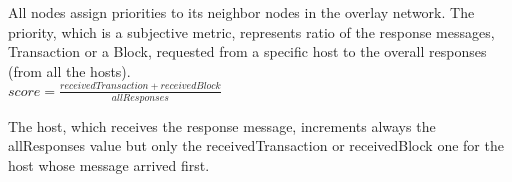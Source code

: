 All nodes assign priorities to its neighbor nodes in the overlay network.
The priority, which is a subjective metric, represents ratio of the response
messages, Transaction or a Block, requested from a specific host to the
overall responses (from all the hosts). \\
$score = \frac{receivedTransaction + receivedBlock}{allResponses}$



The host, which receives the response message, increments always the allResponses value but
only the receivedTransaction or receivedBlock one for the host whose message
arrived first.
